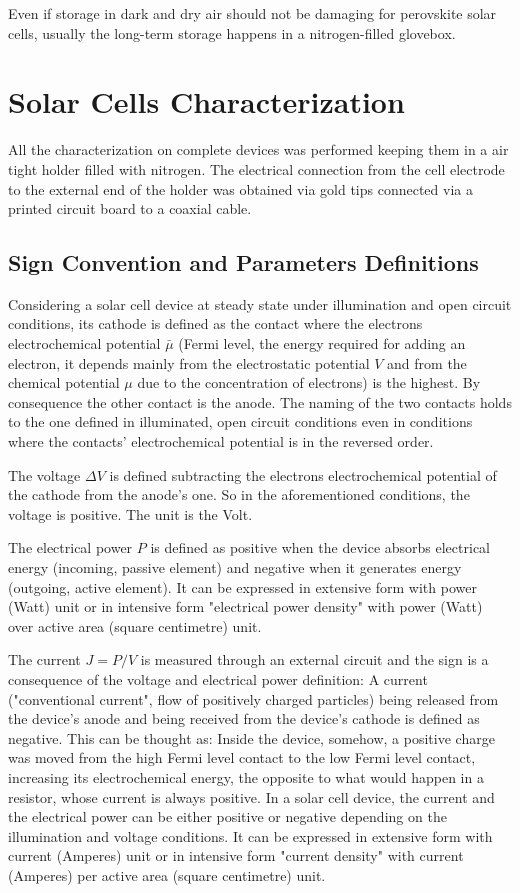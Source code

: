 		Even if storage in dark and dry air should not be damaging for perovskite solar cells, usually the long-term storage happens in a nitrogen-filled glovebox.

\section{Solar Cells Characterization}

	All the characterization on complete devices was performed keeping them in a air tight holder filled with nitrogen. The electrical connection from the cell electrode to the external end of the holder was obtained via gold tips connected via a printed circuit board to a coaxial cable.
	
	\subsection{Sign Convention and Parameters Definitions}
	
	Considering a solar cell device at steady state under illumination and open circuit conditions, its cathode is defined as the contact where the electrons electrochemical potential $\bar\mu$ (Fermi level, the energy required for adding an electron, it depends mainly from the electrostatic potential $V$ and from the chemical potential $\mu$ due to the concentration of electrons) is the highest. By consequence the other contact is the anode. The naming of the two contacts holds to the one defined in illuminated, open circuit conditions even in conditions where the contacts' electrochemical potential is in the reversed order.
	
	The voltage $\Delta V$ is defined subtracting the electrons electrochemical potential of the cathode from the anode's one. So in the aforementioned conditions, the voltage is positive. The unit is the Volt.
	
	The electrical power $P$ is defined as positive when the device absorbs electrical energy (incoming, passive element) and negative when it generates energy (outgoing, active element). It can be expressed in extensive form with power (Watt) unit or in intensive form "electrical power density" with power (Watt) over active area (square centimetre) unit.
	
	The current $J=P/V$ is measured through an external circuit and the sign is a consequence of the voltage and electrical power definition: A current ("conventional current", flow of positively charged particles) being released from the device's anode and being received from the device's cathode is defined as negative. This can be thought as: Inside the device, somehow, a positive charge was moved from the high Fermi level contact to the low Fermi level contact, increasing its electrochemical energy, the opposite to what would happen in a resistor, whose current is always positive. In a solar cell device, the current and the electrical power can be either positive or negative depending on the illumination and voltage conditions. It can be expressed in extensive form with current (Amperes) unit or in intensive form "current density" with current (Amperes) per active area (square centimetre) unit.

